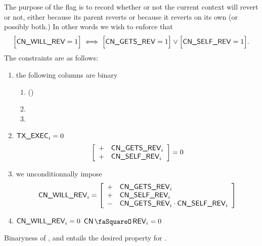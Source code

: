 The purpose of the \cnWillRev{} flag is to record whether or not the current context will revert or not, either because its parent reverts or because it reverts on its own (or possibly both.)
In other words we wish to enforce that
\[
	\Big[\textsf{CN}\textsf{\_WILL\_REV} = 1\Big]
	\iff
	\Big[ \textsf{CN}\textsf{\_GETS\_REV} = 1 \Big] \vee
	\Big[ \textsf{CN}\textsf{\_SELF\_REV} = 1 \Big].	
\]
The constraints are as follows:
\begin{enumerate}
	\item the following columns are binary
		\begin{multicols}{3}
			\begin{enumerate}
				\item \cnWillRev{} \quad(\trash)
				\item \cnGetsRev{}
				\item \cnSelfRev{}
			\end{enumerate}
		\end{multicols}
	\item \If $\textsf{TX}\textsf{\_EXEC}_{i} = 0$ \Then 
		\[
			\left[ \begin{array}{cl}
				+ & \textsf{CN}\textsf{\_GETS\_REV}_{i} \\
				+ & \textsf{CN}\textsf{\_SELF\_REV}_{i} \\
			\end{array} \right]
			= 0
		\]
	\item we unconditionnally impose
		\[
			\textsf{CN}\textsf{\_WILL\_REV}_{i} =
			\left[ \begin{array}{cl}
				+ & \textsf{CN}\textsf{\_GETS\_REV}_{i}                      \\
				+ & \textsf{CN}\textsf{\_SELF\_REV}_{i}                      \\
				- & \textsf{CN}\textsf{\_GETS\_REV}_{i} \cdot \textsf{CN}\textsf{\_SELF\_REV}_{i} \\
			\end{array} \right]
		\]
	\item \If $\textsf{CN}\textsf{\_WILL\_REV}_{i} = 0$ \Then $\cnRevStamp_{i} = 0$
\end{enumerate}
\saNote{} Binaryness of
\cnGetsRev{},
\cnSelfRev{} and
\cnWillRev{}
entails the desired property for \cnWillRev{}.
